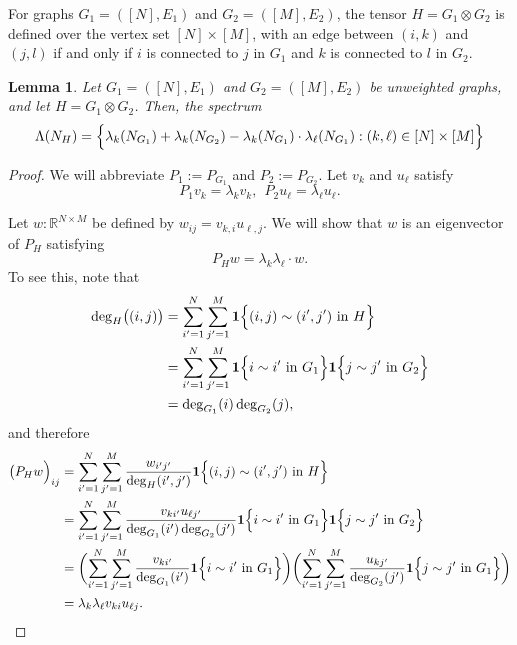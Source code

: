 \documentclass{article}
\newcommand{\Reals}{\mathbb{R}}
\newcommand{\1}{\mathbf{1}}
\theoremstyle{alden}
\theoremstyle{aldenthm}
\newtheorem{lemma}{Lemma}
\theoremstyle{definition}
\theoremstyle{remark}
\begin{document}
For graphs $G_1 = ([N],E_1)$ and $G_2 = ([M],E_2)$, the tensor $H = G_1 \otimes G_2$ is defined over the vertex set $[N] \times [M]$, with an edge between $(i,k)$ and $(j,l)$ if and only if $i$ is connected to $j$ in $G_1$ and $k$ is connected to $l$ in $G_2$.
\begin{lemma}
	\label{lem:tensor}
	Let $G_1 = ([N],E_1)$ and $G_2 = ([M],E_2)$ be unweighted graphs, and let $H = G_1 \otimes G_2$. Then, the spectrum
	\begin{equation*}
	\Lambda(N_H) = \Bigl\{\lambda_k(N_{G_1}) + \lambda_k(N_{G_2}) - \lambda_k(N_{G_1}) \cdot \lambda_{\ell}(N_{G_1}): (k,\ell) \in [N] \times [M] \Bigr\}
	\end{equation*}
\end{lemma}
\begin{proof}
	We will abbreviate $P_1 := P_{G_1}$ and $P_2 := P_{G_2}$. Let $v_k$ and $u_{\ell}$ satisfy
	\begin{equation*}
	P_1 v_{k} = \lambda_k v_k,~~ P_2 u_{\ell} = \lambda_{\ell} u_{\ell}.
	\end{equation*}
	
	Let $w: \Reals^{N \times M}$ be defined by $w_{ij}  = v_{k,i} u_{\ell,j}$. We will show that $w$ is an eigenvector of $P_H$ satisfying 
	\begin{equation*}
	P_H w = \lambda_k \lambda_{\ell} \cdot w.
	\end{equation*}
	To see this, note that
	\begin{align*}
	\deg_H\bigl((i,j)\bigr) & = \sum_{i' = 1}^{N} \sum_{j' = 1}^{M} \1\Bigl\{(i,j) \sim (i',j') ~\textrm{in}~ H \Bigr\} \\
	& = \sum_{i' = 1}^{N} \sum_{j' = 1}^{M} \1\Bigl\{i \sim i' ~\textrm{in}~ G_1 \Bigr\} \1\Bigl\{j \sim j' ~\textrm{in}~ G_2 \Bigr\} \\ 
	& = \deg_{G_1}(i) \deg_{G_2}(j),
	\end{align*}
	and therefore
	\begin{align*}
	\bigl(P_Hw\Bigr)_{ij} & = \sum_{i' = 1}^{N} \sum_{j' = 1}^{M} \frac{w_{i'j'}}{\deg_H(i',j')} \1\Bigl\{(i,j) \sim (i',j') ~\textrm{in}~ H \Bigr\} \\
	& = \sum_{i' = 1}^{N} \sum_{j' = 1}^{M} \frac{v_{ki'} u_{\ell j'}}{\deg_{G_1}(i') \deg_{G_2}(j')} \1\Bigl\{i \sim i' ~\textrm{in}~ G_1 \Bigr\} \1\Bigl\{j \sim j' ~\textrm{in}~ G_2 \Bigr\} \\
	& = \biggl(\sum_{i' = 1}^{N} \sum_{j' = 1}^{M} \frac{v_{ki'}}{\deg_{G_1}(i')} \1\Bigl\{i \sim i' ~\textrm{in}~ G_1 \Bigr\} \biggr) \biggl(\sum_{i' = 1}^{N} \sum_{j' = 1}^{M} \frac{u_{kj'}}{\deg_{G_2}(j')} \1\Bigl\{j \sim j' ~\textrm{in}~ G_1 \Bigr\} \biggr) \\
	& = \lambda_k \lambda_{\ell} v_{ki} u_{\ell j}.
	\end{align*}
	

\end{proof}
\end{document}
